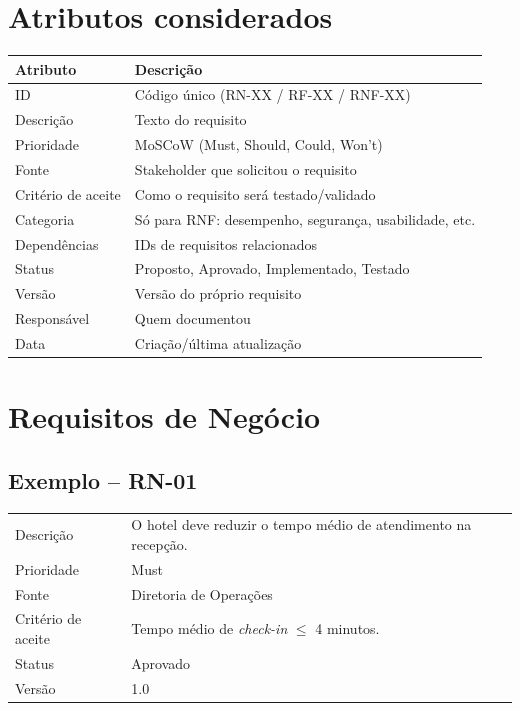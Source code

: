 \documentclass[12pt,a4paper]{article}
\begin{document}
\section{Atributos considerados}
\begin{longtable}{L{3cm} L{9.5cm}}
\toprule
{}
\textbf{Atributo} & \textbf{Descrição} \\
\midrule
ID & Código único (RN-XX / RF-XX / RNF-XX) \\
Descrição & Texto do requisito \\
Prioridade & MoSCoW (Must, Should, Could, Won't) \\
Fonte & Stakeholder que solicitou o requisito \\
Critério de aceite & Como o requisito será testado/validado \\
Categoria & Só para RNF: desempenho, segurança, usabilidade, etc. \\
Dependências & IDs de requisitos relacionados \\
Status & Proposto, Aprovado, Implementado, Testado \\
Versão & Versão do próprio requisito \\
Responsável & Quem documentou \\
Data & Criação/última atualização \\
\bottomrule
\end{longtable}

\section{Requisitos de Negócio}
\subsection*{Exemplo -- RN-01}
\begin{longtable}{L{3cm} L{9.5cm}}
\toprule
{}
 \\
\midrule
Descrição & O hotel deve reduzir o tempo médio de atendimento na recepção. \\
Prioridade & Must \\
Fonte & Diretoria de Operações \\
Critério de aceite & Tempo médio de \textit{check-in} $\leq$ 4 minutos. \\
Status & Aprovado \\
Versão & 1.0 \\
\bottomrule
\end{longtable}
\end{document}
